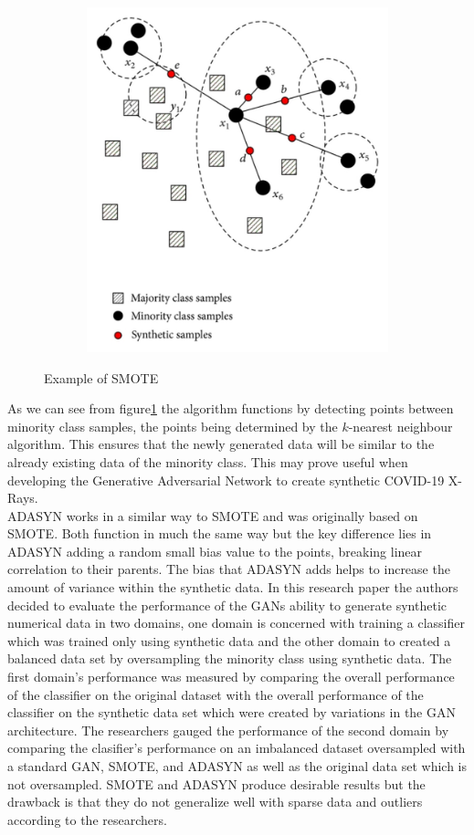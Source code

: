 \vspace{0.5mm}
 \begin{figure}[H]
    \centering
    \includegraphics[width=1\textwidth,height=10cm,keepaspectratio]{Images/SMOTE.png}\\
    \caption{Example of SMOTE\cite{litReviewSmote}}
    \label{fig:Example of The SMOTE Algorithm}
\end{figure}
\vspace{0.5mm}
As we can see from figure\ref{fig:Example of The SMOTE Algorithm} the algorithm functions by detecting points between minority class samples, the points being determined by the $k$-nearest neighbour algorithm.  This ensures that the newly generated data will be similar to the already existing data of the minority class.  This may prove useful when developing the Generative Adversarial Network to create synthetic COVID-19 X-Rays.
\\
ADASYN works in a similar way to SMOTE and was originally based on SMOTE.  Both function in much the same way but the key difference lies in ADASYN adding a random small bias value to the points, breaking linear correlation to their parents.  The bias that ADASYN adds helps to increase the amount of variance within the synthetic data.  In this research paper the authors decided to evaluate the performance of the GANs ability to generate synthetic numerical data in two domains, one domain is concerned with training a classifier which was trained only using synthetic data and the other domain to created a balanced data set by oversampling the minority class using synthetic data.  The first domain's performance was measured by comparing the overall performance of the classifier on the original dataset with the overall performance of the classifier on the synthetic data set which were created by variations in the GAN architecture.  The researchers gauged the performance of the second domain by comparing the clasifier's performance on an imbalanced dataset oversampled with a standard GAN, SMOTE, and ADASYN as well as the original data set which is not oversampled.  SMOTE and ADASYN produce desirable results but the drawback is that they do not generalize well with sparse data and outliers according to the researchers.
